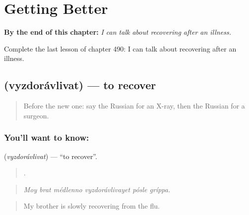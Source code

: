 
\chapter{Getting Better}
\label{ch:ru-getting-better}

\begin{chapteropening}
\textbf{By the end of this chapter:} \emph{I can talk about recovering after an illness.}

Complete the last lesson of chapter 490: I can talk about recovering after an illness.
\end{chapteropening}

\section[\texorpdfstring{\ru{выздоравливать} (vyzdorávlivat)}{выздоравливать (vyzdorávlivat)}]{ (vyzdorávlivat) — to recover}

\label{lesson:RU-C490-vyzdoravlivat}



\begin{quote}
Before the new one: say the Russian for an X-ray, then the Russian for a surgeon.
\end{quote}

\subsection*{You'll want to know: }
\textbf{} (\emph{vyzdorávlivat}) — \textquotedblleft{}to recover\textquotedblright{}.

\begin{quote}
     .
\end{quote}

\begin{quote}
\emph{Moy brat médlenno vyzdorávlivayet pósle gríppa.}
\end{quote}

\begin{quote}
My brother is slowly recovering from the flu.
\end{quote}

